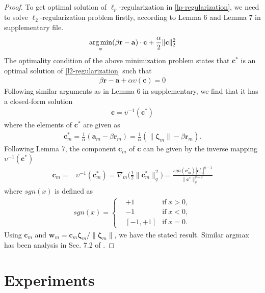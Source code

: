 \documentclass{article}
\newcommand{\argmin}{\operatornamewithlimits{arg\,min}}
\begin{document}
\begin{proof}
To get optimal solution of $\ell_p$-regularization in \eqref{lp-regularization}, we need to solve $\ell_2$-regularization problem firstly, according to Lemma 6 and Lemma 7 in supplementary file.
\begin{align}
 \label{l2-regularization}
    \argmin \limits_{\mathbf{c}} (\beta\mathbf{r} - \mathbf{a})\cdot\mathbf{c}+\frac{\alpha}{2}\|\mathbf{c}\|_2^2
\end{align}
The optimality condition of the above minimization problem\cite{rockafellar2015convex} states that $\mathbf{c}^\ast$ is an optimal solution of \eqref{l2-regularization} such that
\begin{align}
    \label{l2-regularization-subgradient}
        \beta\mathbf{r}-\mathbf{a}+\alpha\upsilon(\mathbf{c})=0
\end{align}
Following similar arguments as in Lemma 6 in supplementary, we find that it has a closed-form solution
\begin{align*}
    \mathbf{c}=\upsilon ^{-1}(\mathbf{c}^\ast)
\end{align*}
where the elements of $\mathbf{c}^\ast$ are given as
\begin{align*}
    \mathbf{c}_m^\ast=\frac{1}{\alpha}(\mathbf{a}_m-\beta\mathbf{r}_m)=\frac{1}{\alpha}(\|\mathbf{\zeta}_m\|-\beta\mathbf{r}_m).
\end{align*}
Following Lemma 7, the component $\mathbf{c}_m$ of $\mathbf{c}$ can be given by the inverse mapping $\upsilon ^{-1}(\mathbf{c}^\ast)$
\begin{align*}
    \mathbf{c}_m=&\upsilon ^{-1}(\mathbf{c}_m^\ast)=\nabla_m\Big(\frac{1}{2}\|\mathbf{c}_m^\ast\|_q^2\Big)=\frac{sgn(\mathbf{c}_m^\ast)|\mathbf{c}_m^\ast|^{q-1}}{\|\mathbf{c}^\ast\|_q^{q-2}}
\end{align*}
where $sgn(x)$ is defined as
\begin{align*}
    sgn(x)=\left\{
        \begin{aligned}
        &+1 &\text{if}\; x > 0,\\
        &-1 &\text{if}\; x < 0,\\
        &[-1,+1] &\text{if}\; x = 0.
        \end{aligned}
    \right.
\end{align*}
Using $\mathbf{c}_m$ and $\mathbf{w}_m=\mathbf{c}_m\mathbf{\zeta}_m/\|\mathbf{\zeta}_m\|$, we have the stated result.
Similar argmax has been analysis in Sec. 7.2 of \cite{Xiao10}.
\end{proof}

\section{Experiments}
\end{document}
